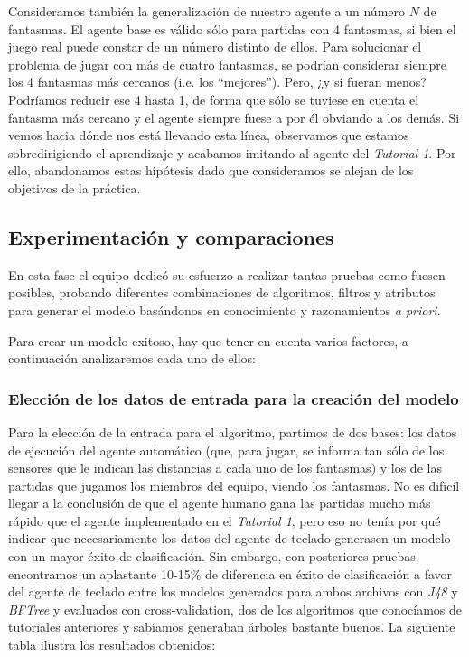 \documentclass[12pt]{article}
\begin{document}
Consideramos también la generalización de nuestro agente a un número $N$ de fantasmas. El agente base es válido sólo para partidas con 4 fantasmas, si bien el juego real puede constar de un número distinto de ellos. Para solucionar el problema de jugar con más de cuatro fantasmas, se podrían considerar siempre los 4 fantasmas más cercanos (i.e. los ``mejores''). Pero, ¿y si fueran menos? Podríamos reducir ese 4 hasta 1, de forma que sólo se tuviese en cuenta el fantasma más cercano y el agente siempre fuese a por él obviando a los demás. Si vemos hacia dónde nos está llevando esta línea, observamos que estamos sobredirigiendo el aprendizaje y acabamos imitando al agente del \emph{Tutorial 1}. Por ello, abandonamos estas hipótesis dado que consideramos se alejan de los objetivos de la práctica.

\newpage
\subsection{Experimentación y comparaciones}

En esta fase el equipo dedicó su esfuerzo a realizar tantas pruebas como fuesen posibles, probando diferentes combinaciones de algoritmos, filtros y atributos para generar el modelo basándonos en conocimiento y razonamientos \emph{a priori}.

Para crear un modelo exitoso, hay que tener en cuenta varios factores, a continuación analizaremos cada uno de ellos:

\subsubsection{Elección de los datos de entrada para la creación del modelo}

Para la elección de la entrada para el algoritmo, partimos de dos bases: los datos de ejecución del agente automático (que, para jugar, se informa tan sólo de los sensores que le indican las distancias a cada uno de los fantasmas) y los de las partidas que jugamos los miembros del equipo, viendo los fantasmas. No es difícil llegar a la conclusión de que el agente humano gana las partidas mucho más rápido que el agente implementado en el \emph{Tutorial 1}, pero eso no tenía por qué indicar que necesariamente los datos del agente de teclado generasen un modelo con un mayor éxito de clasificación. Sin embargo, con posteriores pruebas encontramos un aplastante 10-15\% de diferencia en éxito de clasificación a favor del agente de teclado entre los modelos generados para ambos archivos con \emph{J48} y \emph{BFTree} y evaluados con cross-validation, dos de los algoritmos que conocíamos de tutoriales anteriores y sabíamos generaban árboles bastante buenos. La siguiente tabla ilustra los resultados obtenidos:
\end{document}
